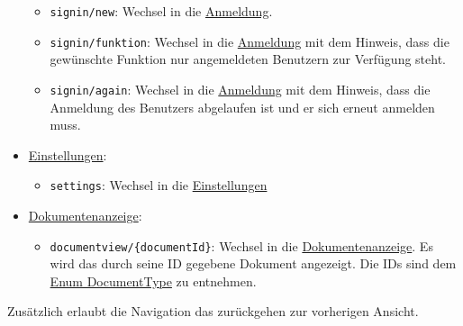 \begin{itemize}
\begin{itemize}
        \item \texttt{signin/new}: Wechsel in die \hyperref[App_SignUp]{Anmeldung}.
        \item \texttt{signin/funktion}: Wechsel in die \hyperref[App_SignUp]{Anmeldung} mit dem Hinweis, dass die gewünschte Funktion nur angemeldeten Benutzern zur Verfügung steht.
        \item \texttt{signin/again}: Wechsel in die \hyperref[App_SignUp]{Anmeldung} mit dem Hinweis, dass die Anmeldung des Benutzers abgelaufen ist und er sich erneut anmelden muss.
    \end{itemize}
    \item \hyperref[App_Settings]{Einstellungen}: 
    \begin{itemize}
        \item \texttt{settings}: Wechsel in die \hyperref[App_Settings]{Einstellungen}
    \end{itemize}
    \item \hyperref[App_DocumentViewer]{Dokumentenanzeige}: 
    \begin{itemize}
        \item \texttt{documentview/\{documentId\}}: Wechsel in die \hyperref[App_DocumentViewer]{Dokumentenanzeige}. 
        Es wird das durch seine ID gegebene Dokument angezeigt. Die IDs sind dem \hyperref[App_DocumentViewer_DocumentType]{Enum DocumentType} zu entnehmen.
    \end{itemize}
\end{itemize}
Zusätzlich erlaubt die Navigation das zurückgehen zur vorherigen Ansicht.


